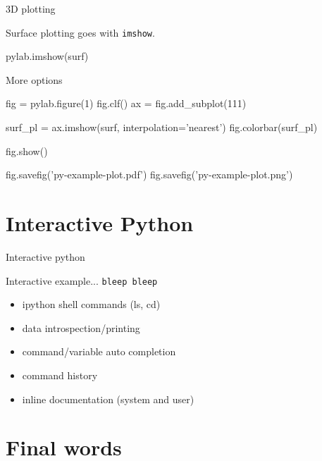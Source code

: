 \documentclass[xetex,10pt]{beamer}
\def\pythoni{\lstinline[language=pythontim]}
\def\spacer{\vspace*{1em}}
\begin{document}
\begin{frame}[fragile]{3D plotting}

Surface plotting goes with \pythoni{imshow}.

\begin{python}
pylab.imshow(surf)
\end{python}

\spacer
\pause
More options

\begin{python}
fig = pylab.figure(1)
fig.clf()
ax = fig.add_subplot(111)

surf_pl = ax.imshow(surf, interpolation='nearest')
fig.colorbar(surf_pl)

fig.show()

fig.savefig('py-example-plot.pdf')
fig.savefig('py-example-plot.png')
\end{python}

\end{frame}

\section{Interactive Python}

\begin{frame}[fragile]{Interactive python}

Interactive example... \pause \texttt{bleep bleep}

\spacer
\pause

\begin{itemize}
	\item ipython shell commands (ls, cd)
	\item data introspection/printing
	\item command/variable auto completion
	\item command history
	\item inline documentation (system and user)
\end{itemize}

\end{frame}

\section{Final words}
\end{document}

